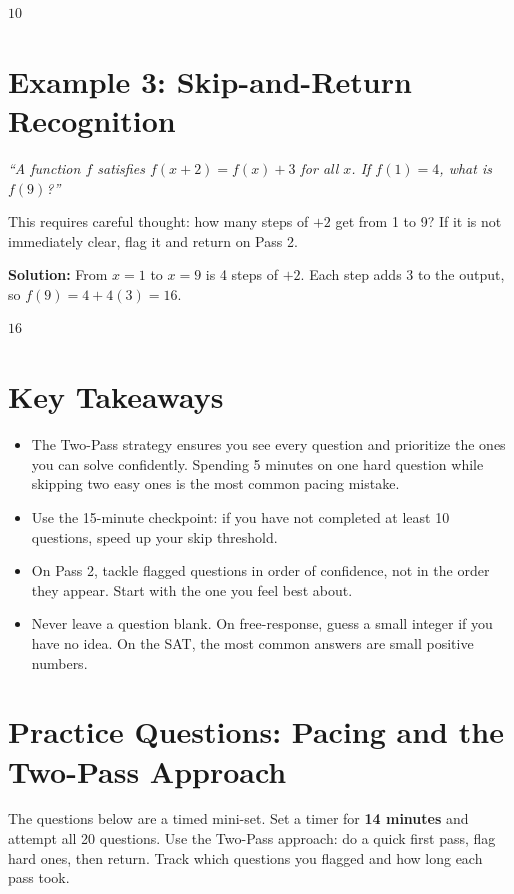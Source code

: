 \documentclass[14pt]{extarticle}
\begin{document}
\(\boxed{10}\)

\section*{Example 3: Skip-and-Return Recognition}

\textit{``A function \(f\) satisfies \(f(x+2) = f(x) + 3\) for all \(x\). If \(f(1) = 4\), what is \(f(9)\)?''}

This requires careful thought: how many steps of \(+2\) get from 1 to 9? If it is not immediately clear, flag it and return on Pass 2.

\textbf{Solution:} From \(x = 1\) to \(x = 9\) is 4 steps of \(+2\). Each step adds 3 to the output, so \(f(9) = 4 + 4(3) = 16\).

\(\boxed{16}\)

\section*{Key Takeaways}
\begin{itemize}
  \item The Two-Pass strategy ensures you see every question and prioritize the ones you can solve confidently. Spending 5 minutes on one hard question while skipping two easy ones is the most common pacing mistake.
  \item Use the 15-minute checkpoint: if you have not completed at least 10 questions, speed up your skip threshold.
  \item On Pass 2, tackle flagged questions in order of confidence, not in the order they appear. Start with the one you feel best about.
  \item Never leave a question blank. On free-response, guess a small integer if you have no idea. On the SAT, the most common answers are small positive numbers.
\end{itemize}

\newpage

\section*{Practice Questions: Pacing and the Two-Pass Approach}

The questions below are a timed mini-set. Set a timer for \textbf{14 minutes} and attempt all 20 questions. Use the Two-Pass approach: do a quick first pass, flag hard ones, then return. Track which questions you flagged and how long each pass took.
\end{document}
